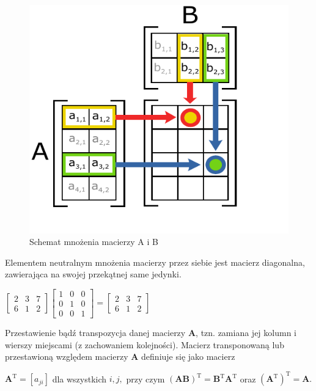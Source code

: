 \documentclass[a4paper,12pt,oneside]{book}
\begin{document}
			\begin{figure}[h!]
				\centering
				\includegraphics[scale=0.8]{Matrix_multiplication_diagram_2.pdf}
				\caption{Schemat mnożenia macierzy A i B}
			\end{figure}
		
			Elementem neutralnym mnożenia macierzy przez siebie jest macierz diagonalna, zawierająca na swojej przekątnej same jedynki.
					\begin{center}
				$\begin{bmatrix}
					2 & 3 & 7 \\
					6 & 1 & 2 
				\end{bmatrix} 
				\begin{bmatrix}
					1 & 0 & 0 \\
					0 & 1 & 0\\
					0 & 0 & 1 
				\end{bmatrix} = 
				\begin{bmatrix}
					2 & 3 & 7 \\
					6 & 1 & 2 
				\end{bmatrix}$ 
			\end{center}
		
			Przestawienie bądź transpozycja danej macierzy $\mathbf {A}$, tzn. zamiana jej kolumn i wierszy miejscami (z zachowaniem kolejności). Macierz transponowaną lub przestawioną względem macierzy $\mathbf  A$ definiuje się jako macierz
			
			$\mathbf {A} ^{\mathrm {T} }=[a_{ji}]$ dla wszystkich $i,j,$ przy czym $(\mathbf {AB} )^{\mathrm {T} }=\mathbf {B} ^{\mathrm {T} }\mathbf {A} ^{\mathrm {T} }$ oraz $\left(\mathbf {A} ^{\mathrm {T} }\right)^{\mathrm {T} }=\mathbf {A} .$\\
			
\end{document}
